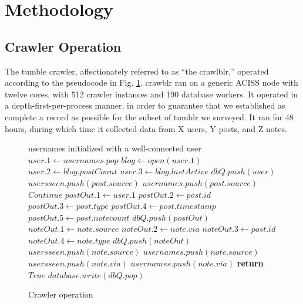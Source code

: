 \section{Methodology}
\label{sec:-method}
\subsection{Crawler Operation}
The tumble crawler, affectionately referred to as ``the crawlblr,'' 
operated according to the pseudocode in Fig. \ref{crawler}.  crawblr 
ran on a generic ACISS node with twelve cores, with 512 crawler 
instances and 190 database workers.  It operated in a 
depth-first-per-process manner, in order to guarantee that we 
established as complete a record as possible for the subset of tumblr 
we surveyed.  It ran for 48 hours, during which time it collected data 
from X users, Y posts, and Z notes.
\begin{figure}
  \begin{algorithmic}[1]
    \Require usernames initialized with a well-connected user
    \State $user.1 \gets usernames.pop$
    \State $blog \gets open(user.1)$
    \State $user.2 \gets blog.postCount$
    \State $user.3 \gets blog.lastActive$
    \State $dbQ.push(user)$ 
    \State $usersseen.push(post.source)$
    \State $usernames.push(post.source)$
    \EndIf
    \State $Continue$
    \State $postOut.1 \gets user.1$
    \State $postOut.2 \gets post.id$
    \State $postOut.3 \gets post.type$
    \State $postOut.4 \gets post.timestamp$
    \State $postOut.5 \gets post.notecount$    
    \State $dbQ.push(postOut)$
    \State $noteOut.1 \gets note.source$
    \State $noteOut.2 \gets note.via$
    \State $noteOut.3 \gets post.id$
    \State $noteOut.4 \gets note.type$
    \State $dbQ.push(noteOut)$
    \State $usersseen.push(note.source)$
    \State $usernames.push(note.source)$
    \EndIf
    \State $usersseen.push(note.via)$
    \State $usernames.push(note.via)$
    \EndIf
    \EndFor
    \EndIf
    \EndFor
    \EndWhile
    \State \textbf{return} $True$    
    \EndProcedure
    \State $database.write(dbQ.pop)$
    \EndWhile
    \EndProcedure
  \end{algorithmic}
  \caption{Crawler operation}\label{crawler}
\end{figure}

